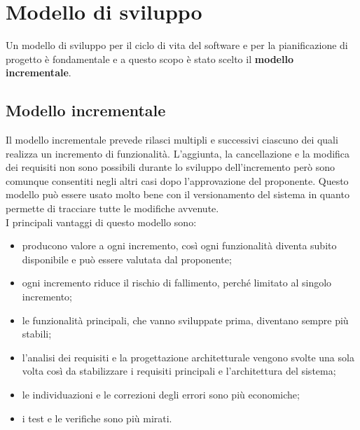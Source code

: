 \section{Modello di sviluppo}
Un modello di sviluppo per il ciclo di vita del software e per la pianificazione di progetto è fondamentale e a questo scopo è stato scelto il \textbf{modello incrementale}.

\subsection{Modello incrementale}
Il modello incrementale prevede rilasci multipli e successivi ciascuno dei quali realizza un incremento di funzionalità.
L'aggiunta, la cancellazione e la modifica dei requisiti non sono possibili durante lo sviluppo dell'incremento però sono comunque consentiti negli altri casi dopo l'approvazione del proponente.
Questo modello può essere usato molto bene con il versionamento del sistema in quanto permette di tracciare tutte le modifiche avvenute.\\
I principali vantaggi di questo modello sono:
\begin{itemize}
	\item producono valore a ogni incremento, così ogni funzionalità diventa subito disponibile e può essere valutata dal proponente;\\
	\item ogni incremento riduce il rischio di fallimento, perché limitato al singolo incremento;\\
	\item le funzionalità principali, che vanno sviluppate prima, diventano sempre più stabili;\\
	\item l'analisi dei requisiti e la progettazione architetturale vengono svolte una sola volta così da stabilizzare i requisiti principali e l'architettura del sistema;\\
	\item le individuazioni e le correzioni degli errori sono più economiche; \\
	\item i test e le verifiche sono più mirati. \\
\end{itemize}

